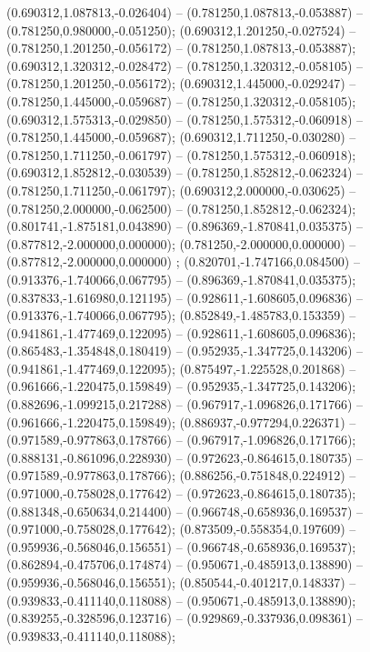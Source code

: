  (0.690312,1.087813,-0.026404) -- (0.781250,1.087813,-0.053887) -- (0.781250,0.980000,-0.051250);
 (0.690312,1.201250,-0.027524) -- (0.781250,1.201250,-0.056172) -- (0.781250,1.087813,-0.053887);
 (0.690312,1.320312,-0.028472) -- (0.781250,1.320312,-0.058105) -- (0.781250,1.201250,-0.056172);
 (0.690312,1.445000,-0.029247) -- (0.781250,1.445000,-0.059687) -- (0.781250,1.320312,-0.058105);
 (0.690312,1.575313,-0.029850) -- (0.781250,1.575312,-0.060918) -- (0.781250,1.445000,-0.059687);
 (0.690312,1.711250,-0.030280) -- (0.781250,1.711250,-0.061797) -- (0.781250,1.575312,-0.060918);
 (0.690312,1.852812,-0.030539) -- (0.781250,1.852812,-0.062324) -- (0.781250,1.711250,-0.061797);
 (0.690312,2.000000,-0.030625) -- (0.781250,2.000000,-0.062500) -- (0.781250,1.852812,-0.062324);
 (0.801741,-1.875181,0.043890) -- (0.896369,-1.870841,0.035375) -- (0.877812,-2.000000,0.000000);
 (0.781250,-2.000000,0.000000) -- (0.877812,-2.000000,0.000000) ;
 (0.820701,-1.747166,0.084500) -- (0.913376,-1.740066,0.067795) -- (0.896369,-1.870841,0.035375);
 (0.837833,-1.616980,0.121195) -- (0.928611,-1.608605,0.096836) -- (0.913376,-1.740066,0.067795);
 (0.852849,-1.485783,0.153359) -- (0.941861,-1.477469,0.122095) -- (0.928611,-1.608605,0.096836);
 (0.865483,-1.354848,0.180419) -- (0.952935,-1.347725,0.143206) -- (0.941861,-1.477469,0.122095);
 (0.875497,-1.225528,0.201868) -- (0.961666,-1.220475,0.159849) -- (0.952935,-1.347725,0.143206);
 (0.882696,-1.099215,0.217288) -- (0.967917,-1.096826,0.171766) -- (0.961666,-1.220475,0.159849);
 (0.886937,-0.977294,0.226371) -- (0.971589,-0.977863,0.178766) -- (0.967917,-1.096826,0.171766);
 (0.888131,-0.861096,0.228930) -- (0.972623,-0.864615,0.180735) -- (0.971589,-0.977863,0.178766);
 (0.886256,-0.751848,0.224912) -- (0.971000,-0.758028,0.177642) -- (0.972623,-0.864615,0.180735);
 (0.881348,-0.650634,0.214400) -- (0.966748,-0.658936,0.169537) -- (0.971000,-0.758028,0.177642);
 (0.873509,-0.558354,0.197609) -- (0.959936,-0.568046,0.156551) -- (0.966748,-0.658936,0.169537);
 (0.862894,-0.475706,0.174874) -- (0.950671,-0.485913,0.138890) -- (0.959936,-0.568046,0.156551);
 (0.850544,-0.401217,0.148337) -- (0.939833,-0.411140,0.118088) -- (0.950671,-0.485913,0.138890);
 (0.839255,-0.328596,0.123716) -- (0.929869,-0.337936,0.098361) -- (0.939833,-0.411140,0.118088);
